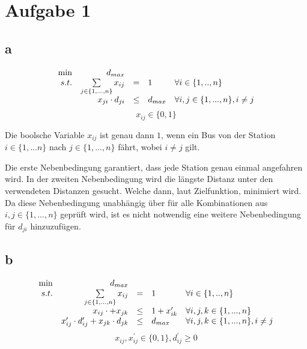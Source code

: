 \documentclass[10pt]{article}
\begin{document}
  \section*{Aufgabe 1}
    \subsection*{a}
      \begin{displaymath}
        \begin{array}{ r r c l l }
          \min & d_{max} & & & \\
          s.t. & \sum\limits_{j\in \{1,...,n\}} x_{ij} & = & 1 & \forall 
            i\in \{1,..,n\}\\
            & x_{ji}\cdot d_{ji} &\leq& d_{max} & \forall i,j \in \{1,...,n\}, i\neq j \\
        \end{array}
      \end{displaymath}
      \begin{displaymath}
        x_{ij}\in\{0,1\}
      \end{displaymath}

      Die boolsche Variable $x_{ij}$ ist genau dann $1$, wenn ein Bus von der
      Station $i\in \{1,...n\}$ nach $j \in \{1,...,n\}$ fährt, wobei $i\neq j$
      gilt.

      Die erste Nebenbedingung garantiert, dass jede Station genau einmal angefahren
      wird. In der zweiten Nebenbedingung wird die längste Distanz unter den
      verwendeten Distanzen gesucht. Welche dann, laut Zielfunktion, minimiert
      wird. Da diese Nebenbedingung unabhängig über für alle Kombinationen aus
      $i,j\in \{1,...,n\}$ geprüft wird, ist es nicht notwendig eine weitere
      Nebenbedingung für $d_{ji}$ hinzuzufügen.


    \subsection*{b}
      \begin{displaymath}
        \begin{array}{ r r c l l }
          \min & d_{max} & & & \\
          s.t. & \sum\limits_{j\in \{1,...,n\}} x_{ij} & = & 1 & \forall 
            i\in \{1,..,n\}\\
            & x_{ij}\cdot + x_{jk} & \leq &1 + x_{ik}^{\prime} & \forall
                i,j,k \in \{1,...,n\} \\
            & x_{ij}^{\prime}\cdot d_{ij}^{\prime} + x_{jk} \cdot d_{jk}&\leq&
              d_{max} & \forall i,j,k \in \{1,...,n\}, i\neq j \\
        \end{array}
      \end{displaymath}
      \begin{displaymath}
        x_{ij},x_{ij}^{\prime}\in\{0,1\}, d_{ij}^{\prime} \geq 0
      \end{displaymath}
\end{document}
